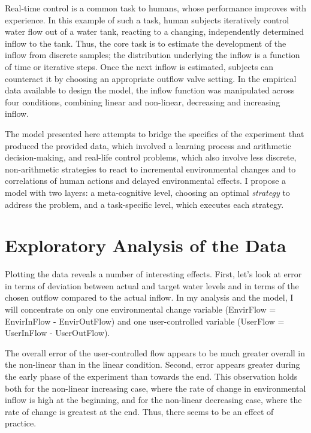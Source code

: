 \documentclass[twocolumn]{article}
\begin{document}
Real-time control is a common task to humans, whose performance improves with experience. In this example of such a task, human subjects iteratively control water flow out of a water tank, reacting to a changing, independently determined inflow to the tank.  Thus, the core task is to estimate the development of the inflow from discrete samples; the distribution underlying the inflow is a function of time or iterative steps.  Once the next inflow is estimated, subjects can counteract it by choosing an appropriate outflow valve setting.   In the empirical data available to design the model, the inflow function was manipulated across four conditions, combining linear and non-linear, decreasing and increasing inflow.

The model presented here attempts to bridge the specifics of the experiment that produced the provided data, which involved a learning process and arithmetic decision-making, and real-life control problems, which also involve less discrete, non-arithmetic strategies to react to incremental environmental changes and to correlations of human actions and delayed environmental effects.  I propose a model with two layers: a meta-cognitive level, choosing an optimal \emph{strategy} to address the problem, and a task-specific level, which executes each strategy.


\section{Exploratory Analysis of the Data}
\label{sec:expl-analys-data}


Plotting the data reveals a number of interesting effects.  First, let's look at error in terms of deviation between actual and target water levels and in terms of the chosen outflow compared to the actual inflow.  In my analysis and the model, I will concentrate on only one environmental change variable (EnvirFlow = EnvirInFlow - EnvirOutFlow) and one user-controlled variable (UserFlow = UserInFlow - UserOutFlow).  

The overall error of the user-controlled flow appears to be much greater overall in the non-linear than in the linear condition.  Second, error appears greater during the early phase of the experiment than towards the end.  This observation holds both for the non-linear increasing case, where the rate of change in environmental inflow is high at the beginning, and for the non-linear decreasing case, where the rate of change is greatest at the end.  Thus, there seems to be an effect of practice.
\end{document}
